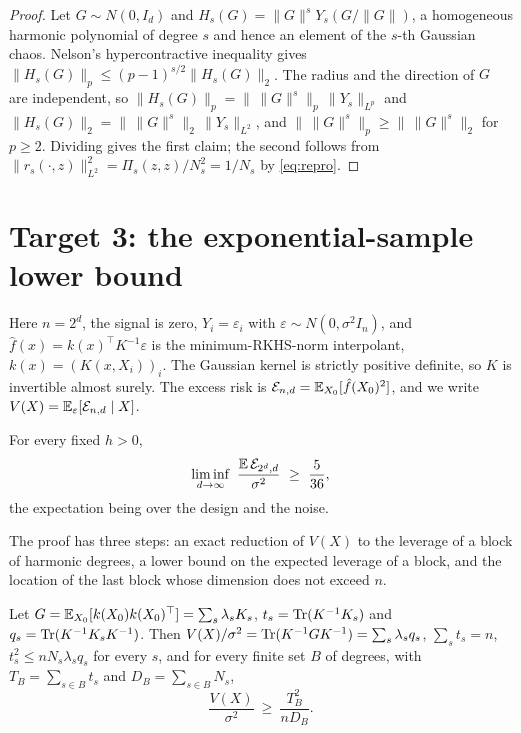 \begin{proof}
Let $G\sim N(0,I_d)$ and $H_s(G)=\|G\|^sY_s(G/\|G\|)$, a homogeneous harmonic polynomial of degree $s$
and hence an element of the $s$-th Gaussian chaos. Nelson's hypercontractive inequality
\cite{Nelson,Janson} gives $\|H_s(G)\|_p\le(p-1)^{s/2}\|H_s(G)\|_2$. The radius and the direction of $G$
are independent, so $\|H_s(G)\|_p=\|\,\|G\|^s\|_p\,\|Y_s\|_{L^p}$ and $\|H_s(G)\|_2=\|\,\|G\|^s\|_2\,\|Y_s\|_{L^2}$,
and $\|\,\|G\|^s\|_p\ge\|\,\|G\|^s\|_2$ for $p\ge2$. Dividing gives the first claim; the second follows
from $\|r_s(\cdot,z)\|_{L^2}^2=\Pi_s(z,z)/N_s^2=1/N_s$ by \eqref{eq:repro}.
\end{proof}

\section{Target 3: the exponential-sample lower bound}\label{sec:proofT3}

Here $n=2^d$, the signal is zero, $Y_i=\varepsilon_i$ with $\varepsilon\sim N(0,\sigma^2I_n)$, and
$\hat f(x)=k(x)^\top K^{-1}\varepsilon$ is the minimum-RKHS-norm interpolant, $k(x)=(K(x,X_i))_i$. The Gaussian
kernel is strictly positive definite, so $K$ is invertible almost surely. The excess risk is
$\mathcal E_{n,d}=\mathbb{E}_{X_0}[\hat f(X_0)^2]$, and we write $V(X)=\mathbb{E}_\varepsilon[\mathcal E_{n,d}\mid X]$.

\begin{theorem}[Target 3]\label{thm:T3}
For every fixed $h>0$,
\[
\liminf_{d\to\infty}\ \frac{\mathbb{E}\,\mathcal E_{2^d,d}}{\sigma^2}\ \ge\ \frac5{36},
\]
the expectation being over the design and the noise.
\end{theorem}

The proof has three steps: an exact reduction of $V(X)$ to the leverage of a block of harmonic degrees,
a lower bound on the expected leverage of a block, and the location of the last block whose dimension
does not exceed $n$.

\begin{lemma}\label{lem:reduction}
Let $G=\mathbb{E}_{X_0}[k(X_0)k(X_0)^\top]=\sum_s\lambda_sK_s$, $t_s=\operatorname{Tr}(K^{-1}K_s)$ and $q_s=\operatorname{Tr}(K^{-1}K_sK^{-1})$.
Then $V(X)/\sigma^2=\operatorname{Tr}(K^{-1}GK^{-1})=\sum_s\lambda_sq_s$, $\sum_st_s=n$, $t_s^2\le nN_s\lambda_sq_s$ for
every $s$, and for every finite set $B$ of degrees, with $T_B=\sum_{s\in B}t_s$ and $D_B=\sum_{s\in B}N_s$,
\begin{equation}
\frac{V(X)}{\sigma^2}\ \ge\ \frac{T_B^2}{nD_B}.
\label{eq:blockreduction}
\end{equation}
\end{lemma}

